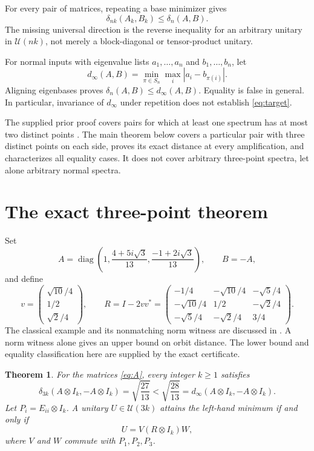 \documentclass[11pt]{article}
\newtheorem{theorem}{Theorem}[section]
\theoremstyle{definition}\newtheorem{definition}[theorem]{Definition}
\theoremstyle{remark}\newtheorem{remark}[theorem]{Remark}
\newcommand{\U}{\mathcal U}
\newcommand{\diag}{\operatorname{diag}}
\newcommand{\dd}{\delta}
\newcommand{\dm}{d_\infty}
\begin{document}
For every pair of matrices, repeating a base minimizer gives
\begin{equation}\label{eq:easy}
 \dd_{nk}(A_k,B_k)\le\dd_n(A,B).
\end{equation}
The missing universal direction is the reverse inequality for an arbitrary unitary in $\U(nk)$, not merely a block-diagonal or tensor-product unitary.

For normal inputs with eigenvalue lists $a_1,\ldots,a_n$ and $b_1,\ldots,b_n$, let
\[
 \dm(A,B)=\min_{\pi\in S_n}\max_i|a_i-b_{\pi(i)}|.
\]
Aligning eigenbases proves $\dd_n(A,B)\le\dm(A,B)$. Equality is false in general. In particular, invariance of $\dm$ under repetition does not establish \eqref{eq:target}.

The supplied prior proof covers pairs for which at least one spectrum has at most two distinct points \cite{holden}. The main theorem below covers a particular pair with three distinct points on each side, proves its exact distance at every amplification, and characterizes all equality cases. It does not cover arbitrary three-point spectra, let alone arbitrary normal spectra.

\section{The exact three-point theorem}
Set
\begin{equation}\label{eq:A}
 A=\diag\left(1,\frac{4+5i\sqrt3}{13},\frac{-1+2i\sqrt3}{13}\right),
 \qquad B=-A,
\end{equation}
and define
\begin{equation}\label{eq:R}
 v=\begin{pmatrix}\sqrt{10}/4\\1/2\\\sqrt2/4\end{pmatrix},\qquad
 R=I-2vv^*=
 \begin{pmatrix}
 -1/4&-\sqrt{10}/4&-\sqrt5/4\\
 -\sqrt{10}/4&1/2&-\sqrt2/4\\
 -\sqrt5/4&-\sqrt2/4&3/4
 \end{pmatrix}.
\end{equation}
The classical example and its nonmatching norm witness are discussed in \cite{tang}. A norm witness alone gives an upper bound on orbit distance. The lower bound and equality classification here are supplied by the exact certificate.

\begin{theorem}\label{thm:main}
For the matrices \eqref{eq:A}, every integer $k\ge1$ satisfies
\begin{equation}\label{eq:main}
 \dd_{3k}(A\otimes I_k,-A\otimes I_k)=\sqrt{\frac{27}{13}}
 <\sqrt{\frac{28}{13}}
 =\dm(A\otimes I_k,-A\otimes I_k).
\end{equation}
Let $P_i=E_{ii}\otimes I_k$. A unitary $U\in\U(3k)$ attains the left-hand minimum if and only if
\begin{equation}\label{eq:rigidityform}
 U=V(R\otimes I_k)W,
\end{equation}
where $V$ and $W$ commute with $P_1,P_2,P_3$.
\end{theorem}
\end{document}
